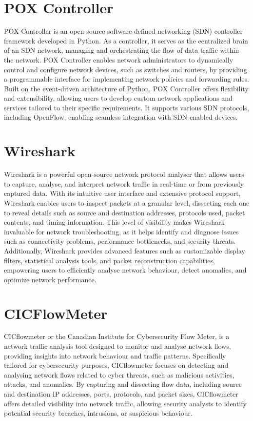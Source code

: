 \section{POX Controller}
\vspace{-18pt}
POX Controller is an open-source software-defined networking (SDN) controller framework developed in Python. As a controller, it serves as the centralized brain of an SDN network, managing and orchestrating the flow of data traffic within the network. POX Controller enables network administrators to dynamically control and configure network devices, such as switches and routers, by providing a programmable interface for implementing network policies and forwarding rules. Built on the event-driven architecture of Python, POX Controller offers flexibility and extensibility, allowing users to develop custom network applications and services tailored to their specific requirements. It supports various SDN protocols, including OpenFlow, enabling seamless integration with SDN-enabled devices.
\section{Wireshark}
\vspace{-18pt}
Wireshark is a powerful open-source network protocol analyser that allows users to capture, analyse, and interpret network traffic in real-time or from previously captured data. With its intuitive user interface and extensive protocol support, Wireshark enables users to inspect packets at a granular level, dissecting each one to reveal details such as source and destination addresses, protocols used, packet contents, and timing information. This level of visibility makes Wireshark invaluable for network troubleshooting, as it helps identify and diagnose issues such as connectivity problems, performance bottlenecks, and security threats. Additionally, Wireshark provides advanced features such as customizable display filters, statistical analysis tools, and packet reconstruction capabilities, empowering users to efficiently analyse network behaviour, detect anomalies, and optimize network performance.
\section{CICFlowMeter}
\vspace{-18pt}
CICflowmeter or the Canadian Institute for Cybersecurity Flow Meter, is a network traffic analysis tool designed to monitor and analyse network flows, providing insights into network behaviour and traffic patterns. Specifically tailored for cybersecurity purposes, CICflowmeter focuses on detecting and analysing network flows related to cyber threats, such as malicious activities, attacks, and anomalies. By capturing and dissecting flow data, including source and destination IP addresses, ports, protocols, and packet sizes, CICflowmeter offers detailed visibility into network traffic, allowing security analysts to identify potential security breaches, intrusions, or suspicious behaviour.
